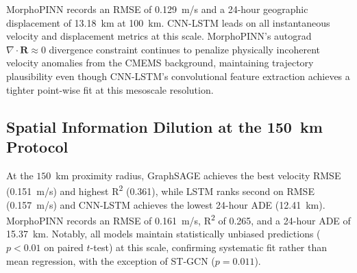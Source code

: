 \documentclass[conference]{IEEEtran}
\begin{document}
MorphoPINN records an RMSE of 0.129~m/s and a 24-hour geographic displacement of 13.18~km at 100~km. CNN-LSTM leads on all instantaneous velocity and displacement metrics at this scale. MorphoPINN's autograd $\nabla \cdot \mathbf{R} \approx 0$ divergence constraint continues to penalize physically incoherent velocity anomalies from the CMEMS background, maintaining trajectory plausibility even though CNN-LSTM's convolutional feature extraction achieves a tighter point-wise fit at this mesoscale resolution.

\subsection{Spatial Information Dilution at the 150~km Protocol}

\begin{table}[h!]
\caption{Trajectory Divergence at the 150~km Protocol Boundary}
\label{tab:150km}
\begin{center}
\end{center}
\end{table}

At the $150$~km proximity radius, GraphSAGE achieves the best velocity RMSE (0.151~m/s) and highest R\textsuperscript{2} (0.361), while LSTM ranks second on RMSE (0.157~m/s) and CNN-LSTM achieves the lowest 24-hour ADE (12.41~km). MorphoPINN records an RMSE of 0.161~m/s, R\textsuperscript{2} of 0.265, and a 24-hour ADE of 15.37~km. Notably, all models maintain statistically unbiased predictions ($p < 0.01$ on paired $t$-test) at this scale, confirming systematic fit rather than mean regression, with the exception of ST-GCN ($p = 0.011$).
\end{document}
